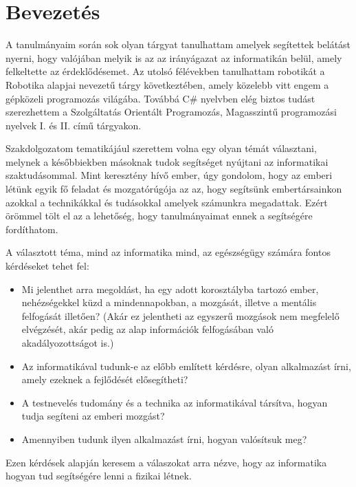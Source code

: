 \documentclass[tocnopagenum]{thesis-ekf}
\theoremstyle{definition}
\theoremstyle{remark}
\begin{document}
	\chapter*{Bevezetés}
	A tanulmányaim során sok olyan tárgyat tanulhattam amelyek segítettek belátást nyerni, hogy valójában melyik is az az irányágazat az informatikán belül, amely felkeltette az érdeklődésemet. Az utolsó félévekben tanulhattam robotikát a Robotika alapjai nevezetű tárgy következtében, amely közelebb vitt engem a gépközeli programozás világába. Továbbá C\# nyelvben elég biztos tudást szerezhettem a Szolgáltatás Orientált Programozás, Magasszintű programozási nyelvek I. és II. című tárgyakon.
	\par
	Szakdolgozatom tematikájául szerettem volna egy olyan témát választani, melynek a későbbiekben másoknak tudok segítséget nyújtani az informatikai szaktudásommal.
	Mint keresztény hívő ember, úgy gondolom, hogy az emberi létünk egyik fő feladat és mozgatórúgója az az, hogy segítsünk embertársainkon azokkal a technikákkal és tudásokkal amelyek számunkra megadattak. Ezért örömmel tölt el az a lehetőség, hogy tanulmányaimat ennek a segítségére fordíthatom. 
	\par
	A választott téma, mind az informatika mind, az egészségügy számára fontos kérdéseket tehet fel:
	\begin{itemize}
		\item  Mi jelenthet arra megoldást, ha egy adott korosztályba tartozó ember, nehézségekkel küzd a mindennapokban, a mozgását, illetve a mentális felfogását illetően? (Akár ez jelentheti az egyszerű mozgások nem megfelelő elvégzését, akár pedig az alap információk felfogásában való akadályozottságot is.)
		\item  Az informatikával tudunk-e az előbb említett kérdésre, olyan alkalmazást írni, amely ezeknek a fejlődését elősegítheti?
		\item A testnevelés tudomány és a technika az informatikával társítva, hogyan tudja segíteni az emberi mozgást?
		\item Amennyiben tudunk ilyen alkalmazást írni, hogyan valósítsuk meg?
	
	\end{itemize}
 	Ezen kérdések alapján keresem a válaszokat arra nézve, hogy az informatika hogyan tud segítségére lenni a fizikai létnek. 
 
\end{document}
